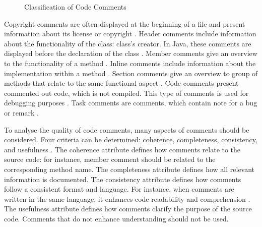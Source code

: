 \begin{figure}[H]
\centering
{}
\caption{Classification of Code Comments}
\cite{hassan2022code}
\label{fig:comment_classification}
\end{figure}





Copyright comments are often displayed at the beginning of a file and present information about its license or copyright \cite{steidl2013quality}. Header comments include information about the functionality of the class: class's creator. In Java, these comments are displayed before the declaration of the class \cite{hassan2022code}. Member comments give an overview to the functionality of a method \cite{steidl2013quality}. Inline comments include information about the implementation within a method \cite{steidl2013quality}. Section comments give an overview to group of methods that relate to the same functional aspect \cite{hassan2022code}. Code comments present commented out code, which is not compiled. This type of comments is used for debugging purposes \cite{steidl2013quality}. Task comments are comments, which contain note for a bug or remark \cite{steidl2013quality}.



To analyse the quality of code comments, many aspects of comments should be considered. Four criteria can be determined: coherence, completeness, consistency, and usefulness \cite{steidl2013quality}.
The coherence attribute defines how comments relate to the source code: for instance, member comment should be related to the corresponding method name.
The completeness attribute defines how all relevant information is documented. 
The consistency attribute defines how comments follow a consistent format and language. For instance, when comments are written in the same language, it enhances code readability and comprehension \cite{steidl2013quality}.
The usefulness attribute defines how comments clarify the purpose of the source code. Comments that do not enhance understanding should not be used. 


